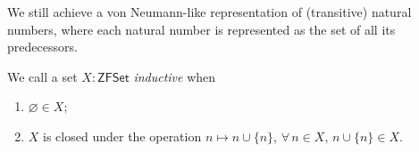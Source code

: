 %
%
We still achieve a von Neumann-like representation of (transitive) natural numbers, where each natural number is represented as the set of all its predecessors.

%
\begin{definition}
  We call a set $X : \mathsf{ZFSet}$ \emph{inductive} when
  \begin{enumerate}
    \item $\varnothing \in X$;
    \item $X$ is closed under the operation $n \mapsto n \cup \{n\}$, \ie
          \( \forall\, n \in X,\, n \cup \{n\} \in X \).
  \end{enumerate}
\end{definition}

